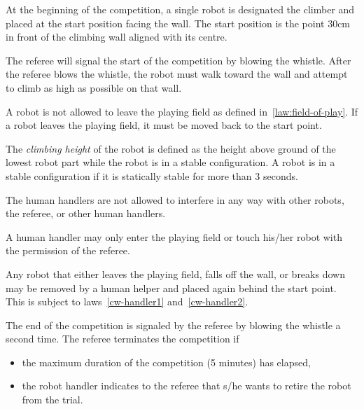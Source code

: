 \documentclass[12pt]{hurocup}
\begin{document}
\begin{lawlist}[CW]
  
\item At the beginning of the competition, a single robot is
  designated the climber and placed at the start position facing the
  wall. The start position is the point 30cm in front of the climbing
  wall aligned with its centre.

\item The referee will signal the start of the competition by blowing
  the whistle. After the referee blows the whistle, the robot must
  walk toward the wall and attempt to climb as high as possible on
  that wall.

\item A robot is not allowed to leave the playing field as defined
  in~\ref{law:field-of-play}.  If a robot leaves the playing field, it
  must be moved back to the start point.

\item The \emph{climbing height} of the robot is defined as the height
  above ground of the lowest robot part while the robot is in a stable
  configuration. A robot is in a stable configuration if it is
  statically stable for more than 3 seconds.

\item \label{cw-handler1} The human handlers are not allowed to
  interfere in any way with other robots, the referee, or other human
  handlers.

\item \label{cw-handler2} A human handler may only enter the playing
  field or touch his/her robot with the permission of the referee.

\item Any robot that either leaves the playing field, falls off the
  wall, or breaks down may be removed by a human helper and placed
  again behind the start point. This is subject to
  laws~\ref{cw-handler1} and~\ref{cw-handler2}.

\item The end of the competition is signaled by the referee by blowing
  the whistle a second time. The referee terminates the competition
  if
  \begin{itemize}
    \item the maximum duration of the competition (5 minutes) has
      elapsed,
    \item the robot handler indicates to the referee that s/he wants
      to retire the robot from the trial.
  \end{itemize}

\end{lawlist}
\end{document}
